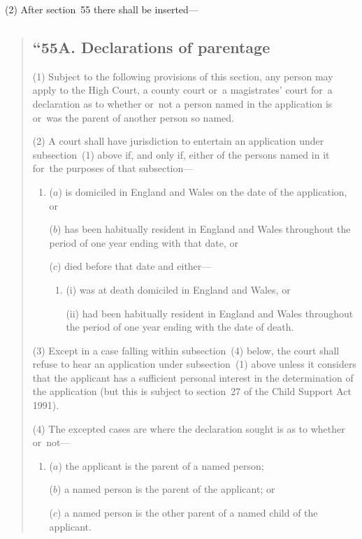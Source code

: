 \documentclass[12pt,a4paper]{article}
\begin{document}
(2) After section~55 there shall be inserted—
\begin{quotation}
\subsection*{“55A. Declarations of parentage}

(1) Subject to the following provisions of this section, any person may apply to the High Court, a county court or~a magistrates' court for~a declaration as to whether or~not a person named in the application is or~was the parent of another person so named.

(2) A court shall have jurisdiction to entertain an application under subsection~(1)  above if, and only if, either of the persons named in it for~the purposes of that subsection—
\begin{enumerate}\item[]
($a$) is domiciled in England and Wales on the date of the application, or

\begin{sloppypar}
($b$) has been habitually resident in England and Wales throughout the period of one year ending with that date, or
\end{sloppypar}

($c$) died before that date and either—
\begin{enumerate}\item[]
(i) was at death domiciled in England and Wales, or

(ii) had been habitually resident in England and Wales throughout the period of one year ending with the date of death.
\end{enumerate}
\end{enumerate}

(3) Except in a case falling within subsection~(4)  below, the court shall refuse to hear an application under subsection~(1)  above unless it considers that the applicant has a sufficient personal interest in the determination of the application (but this is subject to section~27 of the Child Support Act 1991).

(4) The excepted cases are where the declaration sought is as to whether or~not—
\begin{enumerate}\item[]
($a$) the applicant is the parent of a named person;

($b$) a named person is the parent of the applicant; or

($c$) a named person is the other parent of a named child of the applicant.
\end{enumerate}


\end{quotation}
\end{document}
